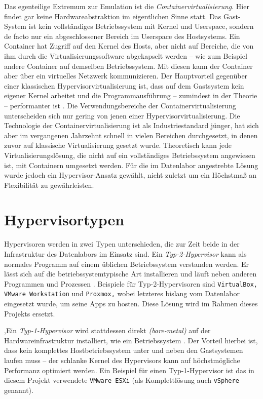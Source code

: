 Das egenteilige Extremum zur Emulation ist die \textit{Containervirtualisierung}. Hier findet gar keine Hardwareabstraktion im eigentlichen Sinne statt.
Das Gast-\glqq System\grqq{} ist kein vollständiges Betriebssystem mit Kernel und Userspace, sondern de facto nur ein abgeschlossener Bereich im Userspace des Hostsystems.
Ein Container hat Zugriff auf den Kernel des Hosts, aber nicht auf Bereiche, die von ihm durch die Virtualisierungssoftware abgekapselt werden -- wie zum Beispiel andere Container auf demselben Betriebssystem.
Mit diesen kann der Container aber über ein virtuelles Netzwerk kommunizieren.
Der Hauptvorteil gegenüber einer klassischen Hypervisorvirtualisierung ist, dass auf dem Gastsystem kein eigener Kernel arbeitet und die Programmausführung -- zumindest in der Theorie -- performanter ist \cite{dockerwhatis}.
Die Verwendungsbereiche der Containervirtualisierung unterscheiden sich nur gering von jenen einer Hypervisorvirtualisierung.
Die Technologie der Containervirtualisierung ist als Industriestandard jünger, hat sich aber im vergangenen Jahrzehnt schnell in vielen Bereichen durchgesetzt, in denen zuvor auf klassische Virtualisierung gesetzt wurde.
Theoretisch kann jede Virtualisierungslösung, die nicht auf ein \glqq vollständiges\grqq{} Betriebssystem angewiesen ist, mit Containern umgesetzt werden.
Für die im Datenlabor angestrebte Lösung wurde jedoch ein Hypervisor-Ansatz gewählt, nicht zuletzt um ein Höchstmaß an Flexibilität zu gewährleisten.

\section{Hypervisortypen} \label{hypervisortypen}
Hypervisoren werden in zwei Typen unterschieden, die zur Zeit beide in der Infrastruktur des Datenlabors im Einsatz sind.
Ein \textit{Typ-2-Hypervisor} kann als normales Programm auf einem üblichen Betriebssystem verstanden werden.
Er lässt sich auf die betriebssystemtypische Art installieren und läuft neben anderen Programmen und Prozessen \cite[71-72]{tanenbaum2015os}.
Beispiele für Typ-2-Hypervisoren sind \texttt{VirtualBox, VMware Workstation} und \texttt{Proxmox,} wobei letzteres bislang vom Datenlabor eingesetzt wurde, um seine Apps zu hosten. Diese Lösung wird im Rahmen dieses Projekts ersetzt.

,Ein \textit{Typ-1-Hypervisor} wird stattdessen direkt \textit{(bare-metal)} auf der Hardwareinfrastruktur installiert, wie ein Betriebssystem \cite[70-71]{tanenbaum2015os}.
Der Vorteil hierbei ist, dass kein komplettes Hostbetriebssystem unter und neben den Gastsystemen laufen muss -- der schlanke Kernel des Hypervisors kann auf höchstmögliche Performanz optimiert werden.
Ein Beispiel für einen Typ-1-Hypervisor ist das in diesem Projekt verwendete \texttt{VMware ESXi} (als Komplettlösung auch \texttt{vSphere} genannt).